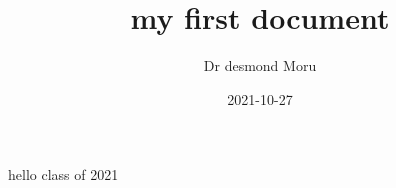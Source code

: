 \documentclass{article}
\title{my first document}
\date{2021-10-27}
\author{Dr desmond Moru}
\begin{document}
	\maketitle
	\newpage
	hello class of 2021
\end{document}
